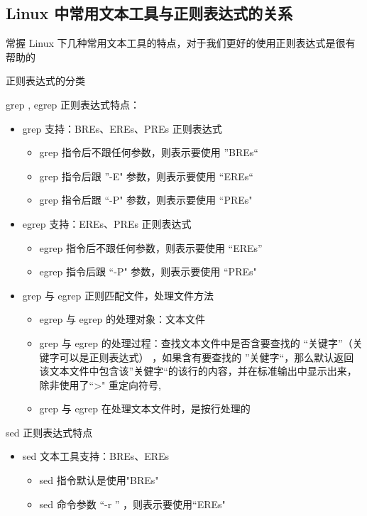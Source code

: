 \subsection{Linux 中常用文本工具与正则表达式的关系}
常握 Linux 下几种常用文本工具的特点，对于我们更好的使用正则表达式是很有帮助的
\begin{ascolorbox5}{正则表达式的分类}
	\begin{ascboxB}{grep , egrep 正则表达式特点：}
		\begin{itemize}
			\item grep 支持：BREs、EREs、PREs 正则表达式
			\begin{itemize}
				\item grep 指令后不跟任何参数，则表示要使用 ”BREs“		
				\item grep 指令后跟 ”-E" 参数，则表示要使用 “EREs“
				\item grep 指令后跟 “-P" 参数，则表示要使用 “PREs"
			\end{itemize}
		\item egrep 支持：EREs、PREs 正则表达式
		\begin{itemize}
			\item egrep 指令后不跟任何参数，则表示要使用 “EREs”
			\item egrep 指令后跟 “-P" 参数，则表示要使用 “PREs"
		\end{itemize}
	\item grep 与 egrep 正则匹配文件，处理文件方法
			\begin{itemize}
		\item egrep 与 egrep 的处理对象：文本文件
		\item grep 与 egrep 的处理过程：查找文本文件中是否含要查找的 “关键字”（关键字可以是正则表达式） ，如果含有要查找的 ”关健字“，那么默认返回该文本文件中包含该”关健字“的该行的内容，并在标准输出中显示出来，除非使用了“>" 重定向符号,
		\item grep 与 egrep 在处理文本文件时，是按行处理的
	\end{itemize}
\end{itemize}
	\end{ascboxB}
	\begin{ascboxB}{sed 正则表达式特点}
	\begin{itemize}
	\item sed 文本工具支持：BREs、EREs
	\begin{itemize}
		\item sed 指令默认是使用"BREs"
		\item sed 命令参数 “-r ” ，则表示要使用“EREs"
	\end{itemize}

\end{itemize}
\end{ascboxB}
\end{ascolorbox5}
